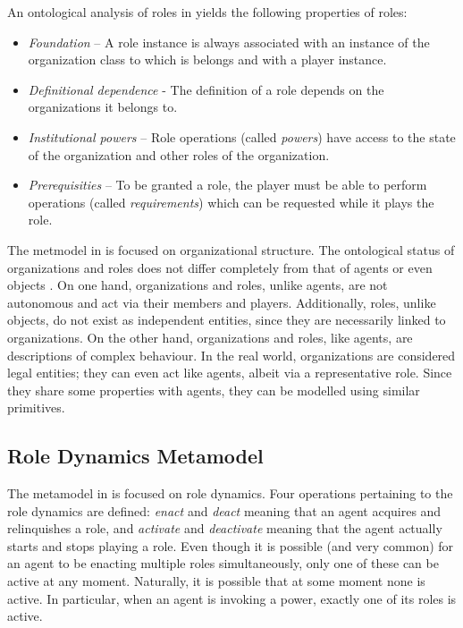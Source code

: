 An ontological analysis of roles in \cite{Boella04} yields the following properties of roles:
\begin{itemize}
	\item \textit{Foundation} -- A role instance is always associated with an instance of the organization class to which is belongs and with a player instance.
	\item \textit{Definitional dependence} - The definition of a role depends on the organizations it belongs to.
	\item \textit{Institutional powers} -- Role operations (called \textit{powers}) have access to the state of the organization and other roles of the organization.
	\item \textit{Prerequisities} -- To be granted a role, the player must be able to perform operations (called \textit{requirements}) which can be requested while it plays the role.
\end{itemize}


The metmodel in \cite{Boella04} is focused on organizational structure.
The ontological status of organizations and roles does not differ completely from that of agents or even objects \cite{Boella04}.
On one hand, organizations and roles, unlike agents, are not autonomous and act via their members and players.
Additionally, roles, unlike objects, do not exist as independent entities, since they are necessarily linked to organizations.
On the other hand, organizations and roles, like agents, are descriptions of complex behaviour.
In the real world, organizations are considered legal entities; they can even act like agents, albeit via a representative role.
Since they share some properties with agents, they can be modelled using similar primitives.

\subsection*{Role Dynamics Metamodel}

The metamodel in \cite{Dastani04} is focused on role dynamics.
Four operations pertaining to the role dynamics are defined: \textit{enact} and \textit{deact} meaning that an agent acquires and relinquishes a role, and \textit{activate} and \textit{deactivate} meaning that the agent actually starts and stops playing a role.
Even though it is possible (and very common) for an agent to be enacting multiple roles simultaneously, only one of these can be active at any moment.
Naturally, it is possible that at some moment none is active.
In particular, when an agent is invoking a power, exactly one of its roles is active.

